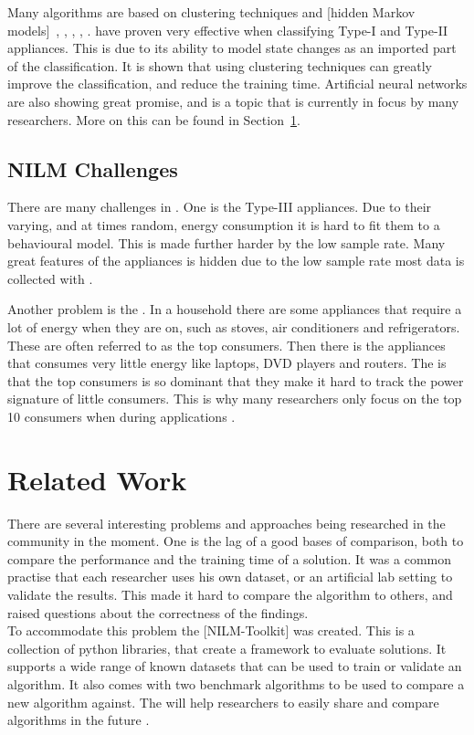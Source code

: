 Many algorithms are based on clustering techniques and [hidden Markov models]~\citep{RefWorks:17}, \citep{RefWorks:23}, \citep{RefWorks:28}, \citep{RefWorks:26}, \citep{RefWorks:24}.  have proven very effective when classifying Type-I and Type-II appliances. This is due to its ability to model state changes as an imported part of the classification. It is shown that using clustering techniques can greatly improve the classification, and reduce the training time. Artificial neural networks are also showing great promise, and is a topic that is currently in focus by many researchers. More on this can be found in Section~\ref{sec:RecRelatedwork}. 

\subsection{NILM Challenges} 
There are many challenges in . One is the Type-III appliances. Due to their varying, and at times random, energy consumption it is hard to fit them to a behavioural model. This is made further harder by the low sample rate. Many great features of the appliances is hidden due to the low sample rate most data is collected with \citep{RefWorks:17}.

Another problem is the . In a household there are some appliances that require a lot of energy when they are on, such as stoves, air conditioners and refrigerators. These are often referred to as the top consumers. Then there is the appliances that consumes very little energy like laptops, DVD players and routers. The  is that the top consumers is so dominant that they make it hard to track the power signature of little consumers. This is why many researchers only focus on the top 10 consumers when during  applications \citep{RefWorks:21}. 

\section{Related Work} 
\label{sec:RecRelatedwork}

There are several interesting problems and approaches being researched in the  community in the moment. One is the lag of a good bases of comparison, both to compare the performance and the training time of a solution. It was a common practise that each researcher uses his own dataset, or an artificial lab setting to validate the results. This made it hard to compare the algorithm to others, and raised questions about the correctness of the findings. \\
To accommodate this problem the [NILM-Toolkit] was created. This is a collection of python libraries, that create a framework to evaluate  solutions. It supports a wide range of known datasets that can be used to train or validate an algorithm. It also comes with two benchmark algorithms to be used to compare a new algorithm against. The  will help researchers to easily share and compare algorithms in the future \citep{RefWorks:21}. 

